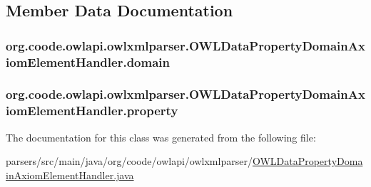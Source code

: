 \subsection{Member Data Documentation}
\hypertarget{classorg_1_1coode_1_1owlapi_1_1owlxmlparser_1_1_o_w_l_data_property_domain_axiom_element_handler_a80a47a35c83f49ea71797b63af55d321}{
\subsubsection[{domain}]{ org.\-coode.\-owlapi.\-owlxmlparser.\-O\-W\-L\-Data\-Property\-Domain\-Axiom\-Element\-Handler.\-domain\hspace{0.3cm}{\ttfamily [private]}}}\label{classorg_1_1coode_1_1owlapi_1_1owlxmlparser_1_1_o_w_l_data_property_domain_axiom_element_handler_a80a47a35c83f49ea71797b63af55d321}
\hypertarget{classorg_1_1coode_1_1owlapi_1_1owlxmlparser_1_1_o_w_l_data_property_domain_axiom_element_handler_a5906cb0c3f3ce9051f78f1f23dac14cf}{
\subsubsection[{property}]{ org.\-coode.\-owlapi.\-owlxmlparser.\-O\-W\-L\-Data\-Property\-Domain\-Axiom\-Element\-Handler.\-property\hspace{0.3cm}{\ttfamily [private]}}}\label{classorg_1_1coode_1_1owlapi_1_1owlxmlparser_1_1_o_w_l_data_property_domain_axiom_element_handler_a5906cb0c3f3ce9051f78f1f23dac14cf}


The documentation for this class was generated from the following file\-:\begin{DoxyCompactItemize}
\item 
parsers/src/main/java/org/coode/owlapi/owlxmlparser/\hyperlink{_o_w_l_data_property_domain_axiom_element_handler_8java}{O\-W\-L\-Data\-Property\-Domain\-Axiom\-Element\-Handler.\-java}\end{DoxyCompactItemize}
